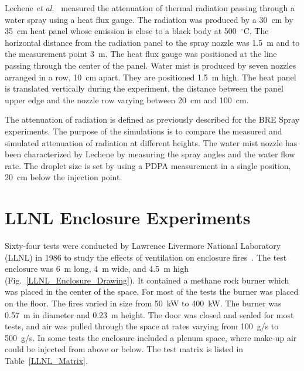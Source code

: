 Lechene {\em et al.}~\cite{Lechene} measured the attenuation of thermal radiation passing through a water
spray using a heat flux gauge. The radiation was produced by a 30~cm by 35~cm heat panel whose emission is close
to a black body at 500~$^\circ$C. The horizontal distance
from the radiation panel to the spray nozzle was 1.5~m and to the measurement point 3~m. The heat flux gauge was positioned at the line passing through the center of the panel.
Water mist is produced by seven nozzles arranged in a row, 10~cm apart. They are positioned 1.5~m high. The heat panel is translated vertically during the experiment,
the distance between the panel upper edge and the nozzle row varying between 20~cm and 100~cm.

The attenuation of radiation is defined as previously described for the BRE Spray experiments.
The purpose of the simulations is to compare the measured and simulated attenuation of radiation at different heights.
The water mist nozzle has been characterized by Lechene by measuring the spray
angles and the water flow rate. The droplet size is set by using a PDPA measurement in a single position, 20~cm below the injection point.


\section{LLNL Enclosure Experiments}

Sixty-four tests were conducted by Lawrence Livermore National Laboratory (LLNL) in 1986 to study the effects of ventilation on enclosure fires~\cite{Foote:LLNL1986}. The test enclosure was 6~m long, 4~m wide, and 4.5~m high (Fig.~\ref{LLNL_Enclosure_Drawing}). It contained a methane rock burner which was placed in the center of the space. For most of the tests the burner was placed on the floor. The fires varied in size from 50~kW to 400~kW. The burner was 0.57~m in diameter and 0.23~m height. The door was closed and sealed for most tests, and air was pulled through the space at rates varying from 100~g/s to 500~g/s. In some tests the enclosure included a plenum space, where make-up air could be injected from above or below. The test matrix is listed in Table~\ref{LLNL_Matrix}.

